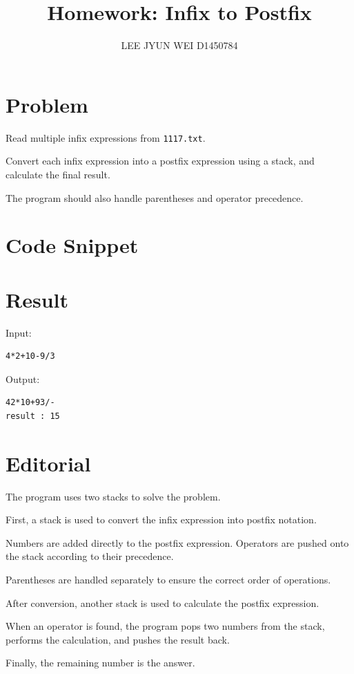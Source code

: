 \documentclass[12pt, a4paper]{article}
\title{Homework: Infix to Postfix}
\author{LEE JYUN WEI \hspace{0.1pt} D1450784}
\date{}
\begin{document}
\maketitle

\section{Problem}

Read multiple infix expressions from
\texttt{1117.txt}.

Convert each infix expression into a postfix
expression using a stack, and calculate the
final result.

The program should also handle parentheses
and operator precedence.

\section{Code Snippet}



\section{Result}

Input:
\begin{verbatim}
4*2+10-9/3
\end{verbatim}

Output:
\begin{verbatim}
42*10+93/-
result : 15
\end{verbatim}

\section{Editorial}

The program uses two stacks to solve the problem.

First, a stack is used to convert the infix
expression into postfix notation.

Numbers are added directly to the postfix
expression. Operators are pushed onto the
stack according to their precedence.

Parentheses are handled separately to ensure
the correct order of operations.

After conversion, another stack is used to
calculate the postfix expression.

When an operator is found, the program pops
two numbers from the stack, performs the
calculation, and pushes the result back.

Finally, the remaining number is the answer.
\end{document}
